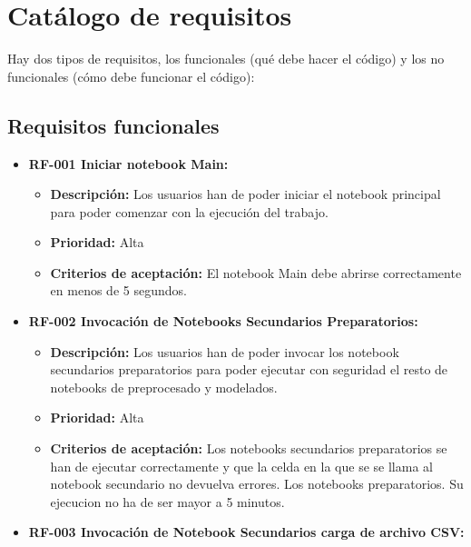 \section{Catálogo de requisitos}

Hay dos tipos de requisitos, los funcionales (qué debe hacer el código) y los no funcionales (cómo debe funcionar el código): 

\subsection{Requisitos funcionales}

\begin{itemize}
\tightlist
\item
  \textbf{RF-001 Iniciar notebook Main:}
 
  \begin{itemize}
  \tightlist
  \item
   \textbf{Descripción:} Los usuarios han de poder iniciar el notebook principal para poder comenzar con la ejecución del trabajo.
  \item
   \textbf{Prioridad:} Alta
  \item
   \textbf{Criterios de aceptación:} El notebook Main debe abrirse correctamente en menos de 5 segundos. 
  \end{itemize}


\item
  \textbf{RF-002 Invocación de Notebooks Secundarios Preparatorios:}
  
  \begin{itemize}
  \tightlist
  \item
    \textbf{Descripción:} Los usuarios han de poder invocar los notebook secundarios preparatorios para poder ejecutar con seguridad el resto de notebooks de preprocesado y modelados.
  \item
   \textbf{Prioridad:} Alta
  \item
   \textbf{Criterios de aceptación:} Los notebooks secundarios preparatorios se han de ejecutar correctamente y que la celda en la que se se llama al notebook secundario no devuelva errores. Los notebooks preparatorios. Su ejecucion no ha de ser mayor a 5 minutos.
  \end{itemize}
 
  
\item
  \textbf{RF-003 Invocación de Notebook Secundarios carga de archivo CSV:}


\end{itemize}
